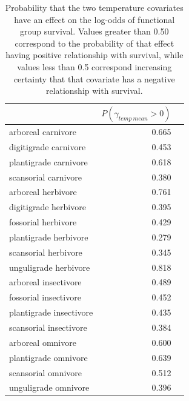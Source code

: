 \documentclass[12pt,letterpaper]{article}
\begin{document}
\begin{table}[ht]
  \centering
  \caption[Posterior probablity of effects of temperature on survival]{Probability that the two temperature covariates have an effect on the log-odds of functional group survival. Values greater than 0.50 correspond to the probability of that effect having positive relationship with survival, while values less than 0.5 correspond increasing certainty that that covariate has a negative relationship with survival.}
  \label{tab:surv_temp}
  \begin{tabular}{ l r r }
    \hline
    & \(P(\gamma_{temp\ mean} > 0)\) \\
    \hline
    arboreal carnivore & 0.665 \\ 
    digitigrade carnivore & 0.453 \\ 
    plantigrade carnivore & 0.618 \\ 
    scansorial carnivore & 0.380 \\ 
    arboreal herbivore & 0.761 \\ 
    digitigrade herbivore & 0.395 \\ 
    fossorial herbivore & 0.429 \\ 
    plantigrade herbivore & 0.279 \\ 
    scansorial herbivore & 0.345 \\ 
    unguligrade herbivore & 0.818 \\ 
    arboreal insectivore & 0.489 \\ 
    fossorial insectivore & 0.452 \\ 
    plantigrade insectivore & 0.435 \\ 
    scansorial insectivore & 0.384 \\ 
    arboreal omnivore & 0.600 \\ 
    plantigrade omnivore & 0.639 \\ 
    scansorial omnivore & 0.512 \\ 
    unguligrade omnivore & 0.396 \\ 
    \hline
  \end{tabular}
\end{table}
\end{document}
